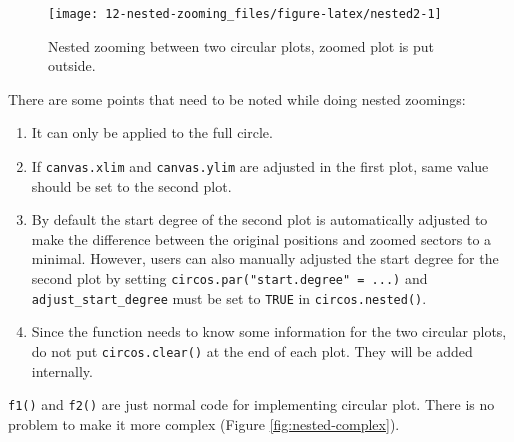 \documentclass[]{book}
\providecommand{\tightlist}{%
  \setlength{\itemsep}{0pt}\setlength{\parskip}{0pt}}
\begin{document}
\begin{figure}

{\centering \texttt{[image: 12-nested-zooming\_files/figure-latex/nested2-1]} 

}

\caption{Nested zooming between two circular plots, zoomed plot is put outside.}\label{fig:nested2}
\end{figure}

There are some points that need to be noted while doing nested zoomings:

\begin{enumerate}
\def\labelenumi{\arabic{enumi}.}
\tightlist
\item
  It can only be applied to the full circle.
\item
  If \texttt{canvas.xlim} and \texttt{canvas.ylim} are adjusted in the
  first plot, same value should be set to the second plot.
\item
  By default the start degree of the second plot is automatically
  adjusted to make the difference between the original positions and
  zoomed sectors to a minimal. However, users can also manually adjusted
  the start degree for the second plot by setting
  \texttt{circos.par("start.degree"\ =\ ...)} and
  \texttt{adjust\_start\_degree} must be set to \texttt{TRUE} in
  \texttt{circos.nested()}.
\item
  Since the function needs to know some information for the two circular
  plots, do not put \texttt{circos.clear()} at the end of each plot.
  They will be added internally.
\end{enumerate}

\texttt{f1()} and \texttt{f2()} are just normal code for implementing
circular plot. There is no problem to make it more complex (Figure
\ref{fig:nested-complex}).
\end{document}
